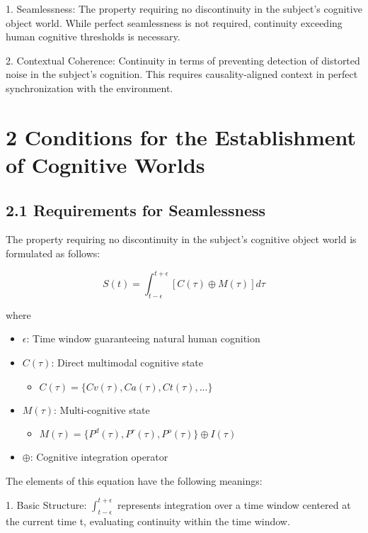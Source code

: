 \documentclass{article}
\begin{document}
1. Seamlessness: The property requiring no discontinuity in the subject's cognitive object world. While perfect seamlessness is not required, continuity exceeding human cognitive thresholds is necessary.

2. Contextual Coherence: Continuity in terms of preventing detection of distorted noise in the subject's cognition. This requires causality-aligned context in perfect synchronization with the environment.

\section{2 Conditions for the Establishment of Cognitive Worlds}

\subsection{2.1 Requirements for Seamlessness}

The property requiring no discontinuity in the subject's cognitive object world is formulated as follows:

$$
S(t) = \int_{t-\epsilon}^{t+\epsilon} [C(\tau) \oplus M(\tau)] d\tau
$$

where
\begin{itemize}
    \item $\epsilon$: Time window guaranteeing natural human cognition
    \item $C(\tau)$: Direct multimodal cognitive state
        \begin{itemize}
            \item $C(\tau) = \{Cv(\tau), Ca(\tau), Ct(\tau), ...\}$
        \end{itemize}
    \item $M(\tau)$: Multi-cognitive state
        \begin{itemize}
            \item $M(\tau) = \{P^d(\tau), P^r(\tau), P^o(\tau)\} \oplus I(\tau)$
        \end{itemize}
    \item $\oplus$: Cognitive integration operator
\end{itemize}

The elements of this equation have the following meanings:

1. Basic Structure: $\int_{t-\epsilon}^{t+\epsilon}$ represents integration over a time window centered at the current time t, evaluating continuity within the time window.
\end{document}

